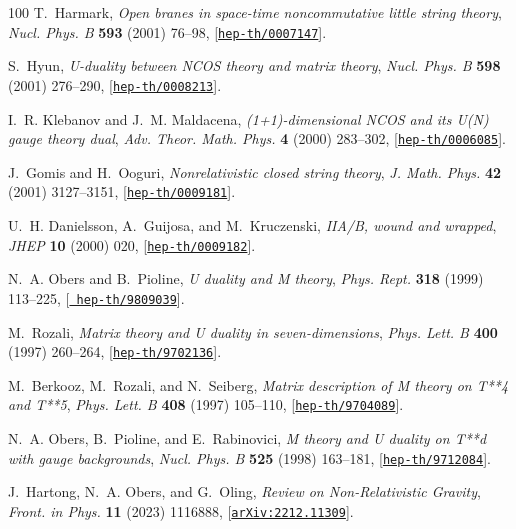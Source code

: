 \documentclass[11pt]{article}
\begin{document}
\begin{thebibliography}{100}
T.~Harmark, {\it {Open branes in space-time noncommutative little string
  theory}},  {\em Nucl. Phys. B} {\bf 593} (2001) 76--98,
  [\href{http://arxiv.org/abs/hep-th/0007147}{{\tt hep-th/0007147}}].

S.~Hyun, {\it {U-duality between NCOS theory and matrix theory}},  {\em Nucl.
  Phys. B} {\bf 598} (2001) 276--290,
  [\href{http://arxiv.org/abs/hep-th/0008213}{{\tt hep-th/0008213}}].

I.~R. Klebanov and J.~M. Maldacena, {\it {(1+1)-dimensional NCOS and its U(N)
  gauge theory dual}},  {\em Adv. Theor. Math. Phys.} {\bf 4} (2000) 283--302,
  [\href{http://arxiv.org/abs/hep-th/0006085}{{\tt hep-th/0006085}}].

J.~Gomis and H.~Ooguri, {\it {Nonrelativistic closed string theory}},  {\em J.
  Math. Phys.} {\bf 42} (2001) 3127--3151,
  [\href{http://arxiv.org/abs/hep-th/0009181}{{\tt hep-th/0009181}}].

U.~H. Danielsson, A.~Guijosa, and M.~Kruczenski, {\it {IIA/B, wound and
  wrapped}},  {\em JHEP} {\bf 10} (2000) 020,
  [\href{http://arxiv.org/abs/hep-th/0009182}{{\tt hep-th/0009182}}].

N.~A. Obers and B.~Pioline, {\it {U duality and M theory}},  {\em Phys. Rept.}
  {\bf 318} (1999) 113--225, [\href{http://arxiv.org/abs/hep-th/9809039}{{\tt
  hep-th/9809039}}].

M.~Rozali, {\it {Matrix theory and U duality in seven-dimensions}},  {\em Phys.
  Lett. B} {\bf 400} (1997) 260--264,
  [\href{http://arxiv.org/abs/hep-th/9702136}{{\tt hep-th/9702136}}].

M.~Berkooz, M.~Rozali, and N.~Seiberg, {\it {Matrix description of M theory on
  T**4 and T**5}},  {\em Phys. Lett. B} {\bf 408} (1997) 105--110,
  [\href{http://arxiv.org/abs/hep-th/9704089}{{\tt hep-th/9704089}}].

N.~A. Obers, B.~Pioline, and E.~Rabinovici, {\it {M theory and U duality on
  T**d with gauge backgrounds}},  {\em Nucl. Phys. B} {\bf 525} (1998)
  163--181, [\href{http://arxiv.org/abs/hep-th/9712084}{{\tt hep-th/9712084}}].

J.~Hartong, N.~A. Obers, and G.~Oling, {\it {Review on Non-Relativistic
  Gravity}},  {\em Front. in Phys.} {\bf 11} (2023) 1116888,
  [\href{http://arxiv.org/abs/2212.11309}{{\tt arXiv:2212.11309}}].


\end{thebibliography}
\end{document}
